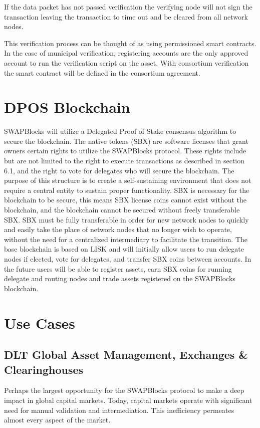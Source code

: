 \documentclass[12pt]{article}
\begin{document}
If the data packet has not passed verification the verifying node will not sign the transaction
leaving the transaction to time out and be cleared from all network nodes.

This verification process can be thought of as using permissioned smart contracts.  In the case of municipal
verification, registering accounts are the only approved account to run the verification script on the asset.
With consortium verification the smart contract will be defined in the consortium agreement.


\section{DPOS Blockchain}
SWAPBlocks will utilize a Delegated Proof of Stake consensus algorithm to secure the blockchain. The native 
tokens (SBX) are software licenses that grant owners certain rights to utilize the SWAPBlocks protocol. These 
rights include but are not limited to the right to execute transactions as described in section 6.1, and 
the right to vote for delegates who will secure the blockchain. The purpose of this structure is to create a 
self-sustaining environment that does not require a central entity to sustain proper functionality. SBX is necessary 
for the blockchain to be secure, this means SBX license coins cannot exist without the blockchain, and the 
blockchain cannot be secured without freely transferable SBX. SBX must be fully transferable in order for new network 
nodes to quickly and easily take the place of network nodes that no longer wish to operate, without the need for 
a centralized intermediary to facilitate the transition. The base blockchain is based on LISK and will initially allow 
users to run delegate nodes if elected, vote for delegates, and transfer SBX coins between accounts. In the future 
users will be able to register assets, earn SBX coins for running delegate and routing nodes and trade assets 
registered on the SWAPBlocks blockchain.  


\pagebreak

\section{Use Cases}

\subsection{DLT Global Asset Management, Exchanges \& Clearinghouses}
Perhaps the largest opportunity for the SWAPBlocks protocol to make a deep impact in global capital markets. Today, 
capital markets operate with significant need for manual validation and intermediation. This inefficiency permeates 
almost every aspect of the market.
\end{document}
